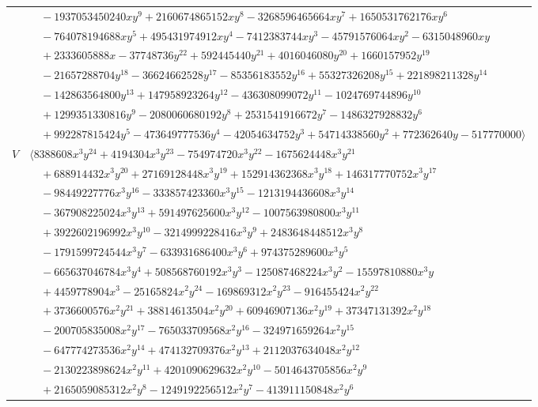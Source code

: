 \documentclass[11pt]{article}
\begin{document}
\begin{longtable}{@{}ll@{}}
 & $\quad -1937053450240xy^{9}+2160674865152xy^{8}-3268596465664xy^{7}+1650531762176xy^{6}$\\
 & $\quad -764078194688xy^{5}+495431974912xy^{4}-7412383744xy^{3}-45791576064xy^{2}-6315048960xy$\\
 & $\quad +2333605888x-37748736y^{22}+592445440y^{21}+4016046080y^{20}+1660157952y^{19}$\\
 & $\quad -21657288704y^{18}-36624662528y^{17}-85356183552y^{16}+55327326208y^{15}+221898211328y^{14}$\\
 & $\quad -142863564800y^{13}+147958923264y^{12}-436308099072y^{11}-1024769744896y^{10}$\\
 & $\quad +1299351330816y^{9}-2080060680192y^{8}+2531541916672y^{7}-1486327928832y^{6}$\\
 & $\quad +992287815424y^{5}-473649777536y^{4}-42054634752y^{3}+54714338560y^{2}+772362640y-517770000\rangle$\\
$V$ & $\langle 8388608x^{3}y^{24}+4194304x^{3}y^{23}-754974720x^{3}y^{22}-1675624448x^{3}y^{21}$\\
 & $\quad +688914432x^{3}y^{20}+27169128448x^{3}y^{19}+152914362368x^{3}y^{18}+146317770752x^{3}y^{17}$\\
 & $\quad -98449227776x^{3}y^{16}-333857423360x^{3}y^{15}-1213194436608x^{3}y^{14}$\\
 & $\quad -367908225024x^{3}y^{13}+591497625600x^{3}y^{12}-1007563980800x^{3}y^{11}$\\
 & $\quad +3922602196992x^{3}y^{10}-3214999228416x^{3}y^{9}+2483648448512x^{3}y^{8}$\\
 & $\quad -1791599724544x^{3}y^{7}-633931686400x^{3}y^{6}+974375289600x^{3}y^{5}$\\
 & $\quad -665637046784x^{3}y^{4}+508568760192x^{3}y^{3}-125087468224x^{3}y^{2}-15597810880x^{3}y$\\
 & $\quad +4459778904x^{3}-25165824x^{2}y^{24}-169869312x^{2}y^{23}-916455424x^{2}y^{22}$\\
 & $\quad +3736600576x^{2}y^{21}+38814613504x^{2}y^{20}+60946907136x^{2}y^{19}+37347131392x^{2}y^{18}$\\
 & $\quad -200705835008x^{2}y^{17}-765033709568x^{2}y^{16}-324971659264x^{2}y^{15}$\\
 & $\quad -647774273536x^{2}y^{14}+474132709376x^{2}y^{13}+2112037634048x^{2}y^{12}$\\
 & $\quad -2130223898624x^{2}y^{11}+4201090629632x^{2}y^{10}-5014643705856x^{2}y^{9}$\\
 & $\quad +2165059085312x^{2}y^{8}-1249192256512x^{2}y^{7}-413911150848x^{2}y^{6}$\\

\end{longtable}
\end{document}
